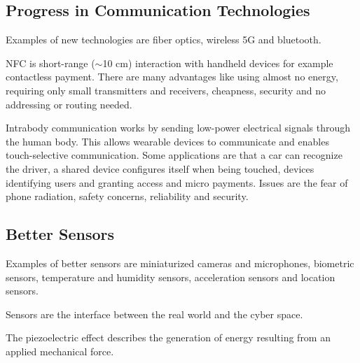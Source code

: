 \subsection{Progress in Communication Technologies}
\begin{mytitle} Examples of new technologies are fiber optics, wireless 5G and bluetooth.
\end{mytitle}
\begin{mytitle} NFC is short-range ($\sim$10 cm) interaction with handheld devices for example contactless payment. There are many advantages like using almost no energy, requiring only small transmitters and receivers, cheapness, security and no addressing or routing needed.
\end{mytitle}
\begin{mytitle} Intrabody communication works by sending low-power electrical signals through the human body. This allows wearable devices to communicate and enables touch-selective communication. Some applications are that a car can recognize the driver, a shared device configures itself when being touched, devices identifying users and granting access and micro payments. Issues are the fear of phone radiation, safety concerns, reliability and security.
\end{mytitle}

\subsection{Better Sensors}
\begin{mytitle} Examples of better sensors are miniaturized cameras and microphones, biometric sensors, temperature and humidity sensors, acceleration sensors and location sensors.
\end{mytitle}
\begin{myremark} Sensors are the interface between the real world and the cyber space.
\end{myremark}
\begin{mytitle} The piezoelectric effect describes the generation of energy resulting from an applied mechanical force. 
\end{mytitle}

